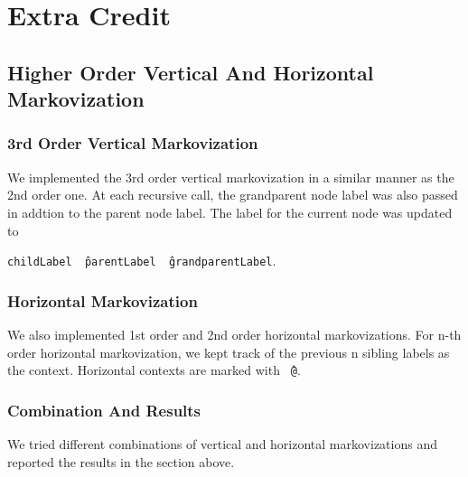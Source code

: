 \documentclass[12pt]{article}
\begin{document}
\section{Extra Credit}
\subsection{Higher Order Vertical And Horizontal Markovization}
\subsubsection{3rd Order Vertical Markovization}
We implemented the 3rd order vertical markovization in a similar manner as the 2nd order one. At each recursive call, the grandparent node label was also passed in addtion to the parent node label. The label for the current node was updated to

\texttt{childLabel \^\ parentLabel \^\ grandparentLabel}. 
\subsubsection{Horizontal Markovization}
We also implemented 1st order and 2nd order horizontal markovizations. For n-th order horizontal markovization, we kept track of the previous n sibling labels as the context. Horizontal contexts are marked with \texttt{\^\ @}.
\subsubsection{Combination And Results}
We tried different combinations of vertical and horizontal markovizations and reported the results in the section above. 
\end{document}
